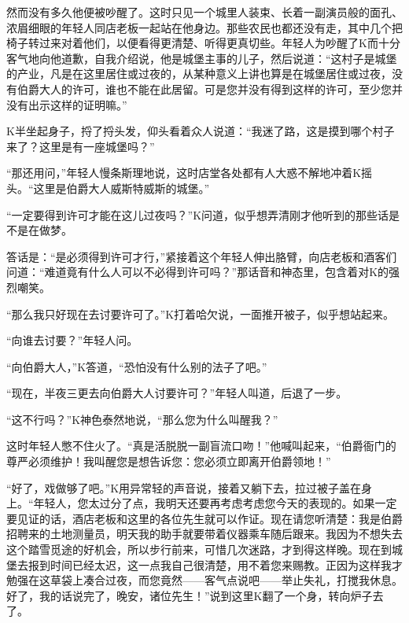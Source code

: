 \documentclass[12pt,a4paper]{article}
\begin{document}
然而没有多久他便被吵醒了。这时只见一个城里人装束、长着一副演员般的面孔、浓眉细眼的年轻人同店老板一起站在他身边。那些农民也都还没有走，其中几个把椅子转过来对着他们，以便看得更清楚、听得更真切些。年轻人为吵醒了K而十分客气地向他道歉，自我介绍说，他是城堡主事的儿子，然后说道：“这村子是城堡的产业，凡是在这里居住或过夜的，从某种意义上讲也算是在城堡居住或过夜，没有伯爵大人的许可，谁也不能在此居留。可是您并没有得到这样的许可，至少您并没有出示这样的证明嘛。”

K半坐起身子，捋了捋头发，仰头看着众人说道：“我迷了路，这是摸到哪个村子来了？这里是有一座城堡吗？”

“那还用问，”年轻人慢条斯理地说，这时店堂各处都有人大惑不解地冲着K摇头。“这里是伯爵大人威斯特威斯的城堡。”

“一定要得到许可才能在这儿过夜吗？”K问道，似乎想弄清刚才他听到的那些话是不是在做梦。

答话是：“是必须得到许可才行，”紧接着这个年轻人伸出胳臂，向店老板和酒客们问道：“难道竟有什么人可以不必得到许可吗？”那话音和神态里，包含着对K的强烈嘲笑。

“那么我只好现在去讨要许可了。”K打着哈欠说，一面推开被子，似乎想站起来。

“向谁去讨要？”年轻人问。

“向伯爵大人，”K答道，“恐怕没有什么别的法子了吧。”

“现在，半夜三更去向伯爵大人讨要许可？”年轻人叫道，后退了一步。

“这不行吗？”K神色泰然地说，“那么您为什么叫醒我？”

这时年轻人憋不住火了。“真是活脱脱一副盲流口吻！”他喊叫起来，“伯爵衙门的尊严必须维护！我叫醒您是想告诉您：您必须立即离开伯爵领地！”

“好了，戏做够了吧。”K用异常轻的声音说，接着又躺下去，拉过被子盖在身上。“年轻人，您太过分了点，我明天还要再考虑考虑您今天的表现的。如果一定要见证的话，酒店老板和这里的各位先生就可以作证。现在请您听清楚：我是伯爵招聘来的土地测量员，明天我的助手就要带着仪器乘车随后跟来。我因为不想失去这个踏雪觅途的好机会，所以步行前来，可惜几次迷路，才到得这样晚。现在到城堡去报到时间已经太迟，这一点我自己很清楚，用不着您来赐教。正因为这样我才勉强在这草袋上凑合过夜，而您竟然——客气点说吧——举止失礼，打搅我休息。好了，我的话说完了，晚安，诸位先生！”说到这里K翻了一个身，转向炉子去了。
\end{document}
